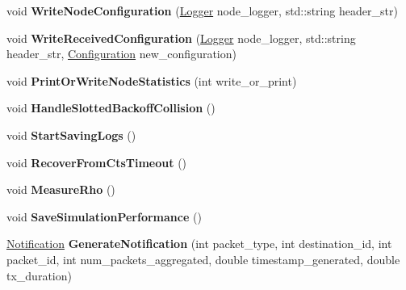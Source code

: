 \begin{DoxyCompactItemize}
\item 
\mbox{\label{classcompcxx__Node__23_ac3ed406b3902c26fe1751b8044a42adf}} 
void {\bfseries Write\+Node\+Configuration} (\hyperlink{structLogger}{Logger} node\+\_\+logger, std\+::string header\+\_\+str)
\item 
\mbox{\label{classcompcxx__Node__23_add479becdbcd125217992c3a3908cada}} 
void {\bfseries Write\+Received\+Configuration} (\hyperlink{structLogger}{Logger} node\+\_\+logger, std\+::string header\+\_\+str, \hyperlink{structConfiguration}{Configuration} new\+\_\+configuration)
\item 
\mbox{\label{classcompcxx__Node__23_adc029cc954973f04763ce6f522bbb784}} 
void {\bfseries Print\+Or\+Write\+Node\+Statistics} (int write\+\_\+or\+\_\+print)
\item 
\mbox{\label{classcompcxx__Node__23_a9631f9e8414c394b91f02e99e0d941f5}} 
void {\bfseries Handle\+Slotted\+Backoff\+Collision} ()
\item 
\mbox{\label{classcompcxx__Node__23_a4b525bd45b73738b6b4e068f1fa50f3f}} 
void {\bfseries Start\+Saving\+Logs} ()
\item 
\mbox{\label{classcompcxx__Node__23_a4cc2834c0231ad207c46d9f40949e3ba}} 
void {\bfseries Recover\+From\+Cts\+Timeout} ()
\item 
\mbox{\label{classcompcxx__Node__23_a3b763b74688ecd5341e5a34447d9791f}} 
void {\bfseries Measure\+Rho} ()
\item 
\mbox{\label{classcompcxx__Node__23_a4624de378d320dade9595f1951cfa54d}} 
void {\bfseries Save\+Simulation\+Performance} ()
\item 
\mbox{\label{classcompcxx__Node__23_aaaae36228f84db854724b930584c1fcf}} 
\hyperlink{structNotification}{Notification} {\bfseries Generate\+Notification} (int packet\+\_\+type, int destination\+\_\+id, int packet\+\_\+id, int num\+\_\+packets\+\_\+aggregated, double timestamp\+\_\+generated, double tx\+\_\+duration)
\item 

\end{DoxyCompactItemize}
